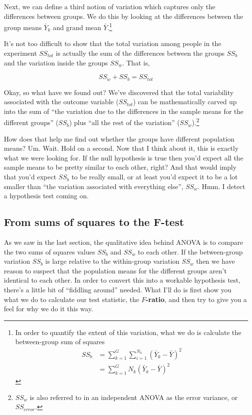 \documentclass[
  a4paper,
]{book}
\begin{document}
Next, we can define a third notion of variation which captures only the
differences between groups. We do this by looking at the differences
between the group means \(\bar{Y}_k\) and grand mean
\(\bar{Y}\).\footnote{In order to quantify the extent of this variation,
  what we do is calculate the between-group sum of squares
  \[\begin{aligned} SS_{b} &= \sum_{k=1}^{G} \sum_{i=1}^{N_k} ( \bar{Y}_{k} - \bar{Y} )^2 \\ &= \sum_{k=1}^{G} N_k ( \bar{Y}_{k} - \bar{Y} )^2 \end{aligned}\]}

It's not too difficult to show that the total variation among people in
the experiment \(SS_{tot}\) is actually the sum of the differences
between the groups \(SS_b\) and the variation inside the groups
\(SS_w\). That is,

\[SS_w+SS_b=SS_{tot}\]

Okay, so what have we found out? We've discovered that the total
variability associated with the outcome variable (\(SS_{tot}\)) can be
mathematically carved up into the sum of ``the variation due to the
differences in the sample means for the different groups'' (\(SS_b\))
plus ``all the rest of the variation'' (\(SS_w\)).\footnote{\(SS_w\) is
  also referred to in an independent ANOVA as the error variance, or
  \(SS_{error}\).}

How does that help me find out whether the groups have different
population means? Um. Wait. Hold on a second. Now that I think about it,
this is exactly what we were looking for. If the null hypothesis is true
then you'd expect all the sample means to be pretty similar to each
other, right? And that would imply that you'd expect \(SS_b\) to be
really small, or at least you'd expect it to be a lot smaller than ``the
variation associated with everything else'', \(SS_w\). Hmm. I detect a
hypothesis test coming on.

\hypertarget{from-sums-of-squares-to-the-f-test}{%
\subsection{From sums of squares to the
F-test}\label{from-sums-of-squares-to-the-f-test}}

As we saw in the last section, the qualitative idea behind ANOVA is to
compare the two sums of squares values \(SS_b\) and \(SS_w\) to each
other. If the between-group variation \(SS_b\) is large relative to the
within-group variation \(SS_w\) then we have reason to suspect that the
population means for the different groups aren't identical to each
other. In order to convert this into a workable hypothesis test, there's
a little bit of ``fiddling around'' needed. What I'll do is first show
you what we do to calculate our test statistic, the
\textbf{\(F\)-ratio}, and then try to give you a feel for why we do it
this way.
\end{document}
